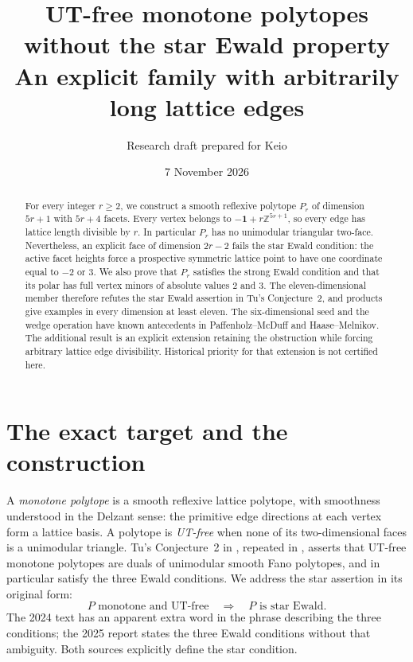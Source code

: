 \documentclass[11pt]{article}
\title{\textbf{UT-free monotone polytopes\\without the star Ewald property}\\[5pt]
\large An explicit family with arbitrarily long lattice edges}
\author{Research draft prepared for Keio}
\date{7 November 2026}
\theoremstyle{remark}\newtheorem{remark}[theorem]{Remark}
\newcommand{\Z}{\mathbb Z}
\newcommand{\one}{\mathbf1}
\begin{document}
\maketitle
\begin{abstract}
For every integer \(r\ge2\), we construct a smooth reflexive polytope \(P_r\)
of dimension \(5r+1\) with \(5r+4\) facets. Every vertex belongs to
\(-\one+r\Z^{5r+1}\), so every edge has lattice length divisible by \(r\).
In particular \(P_r\) has no unimodular triangular two-face. Nevertheless,
an explicit face of dimension \(2r-2\) fails the star Ewald condition:
the active facet heights force a prospective symmetric lattice point
to have one coordinate equal to \(-2\) or \(3\).
We also prove that \(P_r\) satisfies the strong Ewald condition and that
its polar has full vertex minors of absolute values \(2\) and \(3\).
The eleven-dimensional member therefore refutes the star Ewald assertion
in Tu's Conjecture~2, and products give examples in every dimension at
least eleven. The six-dimensional seed and the wedge operation have
known antecedents in Paffenholz--McDuff and Haase--Melnikov.
The additional result is an explicit extension retaining the obstruction
while forcing arbitrary lattice edge divisibility. Historical priority
for that extension is not certified here.
\end{abstract}

\section{The exact target and the construction}

A \emph{monotone polytope} is a smooth reflexive lattice polytope, with
smoothness understood in the Delzant sense: the primitive edge directions
at each vertex form a lattice basis. A polytope is \emph{UT-free} when
none of its two-dimensional faces is a unimodular triangle.
Tu's Conjecture~2 in \cite{Tu24}, repeated in \cite{Tu25}, asserts that
UT-free monotone polytopes are duals of unimodular smooth Fano polytopes,
and in particular satisfy the three Ewald conditions.
We address the star assertion in its original form:
\begin{equation}\label{eq:target}
 P\text{ monotone and UT-free}\quad\Longrightarrow\quad
 P\text{ is star Ewald}.
\end{equation}
The 2024 text has an apparent extra word in the phrase describing
the three conditions; the 2025 report states the three Ewald conditions
without that ambiguity. Both sources explicitly define the star condition.
\end{document}
